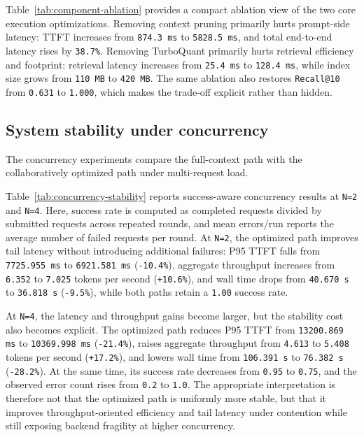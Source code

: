 \documentclass[10pt,twocolumn]{article}
\begin{document}


Table~\ref{tab:component-ablation} provides a compact ablation view of the two core execution optimizations. Removing context pruning primarily hurts prompt-side latency: TTFT increases from \texttt{874.3 ms} to \texttt{5828.5 ms}, and total end-to-end latency rises by \texttt{38.7\%}. Removing TurboQuant primarily hurts retrieval efficiency and footprint: retrieval latency increases from \texttt{25.4 ms} to \texttt{128.4 ms}, while index size grows from \texttt{110 MB} to \texttt{420 MB}. The same ablation also restores \texttt{Recall@10} from \texttt{0.631} to \texttt{1.000}, which makes the trade-off explicit rather than hidden.

\subsection{System stability under concurrency}

The concurrency experiments compare the full-context path with the collaboratively optimized path under multi-request load.



Table~\ref{tab:concurrency-stability} reports success-aware concurrency results at \texttt{N=2} and \texttt{N=4}. Here, success rate is computed as completed requests divided by submitted requests across repeated rounds, and mean errors/run reports the average number of failed requests per round. At \texttt{N=2}, the optimized path improves tail latency without introducing additional failures: P95 TTFT falls from \texttt{7725.955 ms} to \texttt{6921.581 ms} (\texttt{-10.4\%}), aggregate throughput increases from \texttt{6.352} to \texttt{7.025} tokens per second (\texttt{+10.6\%}), and wall time drops from \texttt{40.670 s} to \texttt{36.818 s} (\texttt{-9.5\%}), while both paths retain a \texttt{1.00} success rate.

At \texttt{N=4}, the latency and throughput gains become larger, but the stability cost also becomes explicit. The optimized path reduces P95 TTFT from \texttt{13200.869 ms} to \texttt{10369.998 ms} (\texttt{-21.4\%}), raises aggregate throughput from \texttt{4.613} to \texttt{5.408} tokens per second (\texttt{+17.2\%}), and lowers wall time from \texttt{106.391 s} to \texttt{76.382 s} (\texttt{-28.2\%}). At the same time, its success rate decreases from \texttt{0.95} to \texttt{0.75}, and the observed error count rises from \texttt{0.2} to \texttt{1.0}. The appropriate interpretation is therefore not that the optimized path is uniformly more stable, but that it improves throughput-oriented efficiency and tail latency under contention while still exposing backend fragility at higher concurrency.
\end{document}
